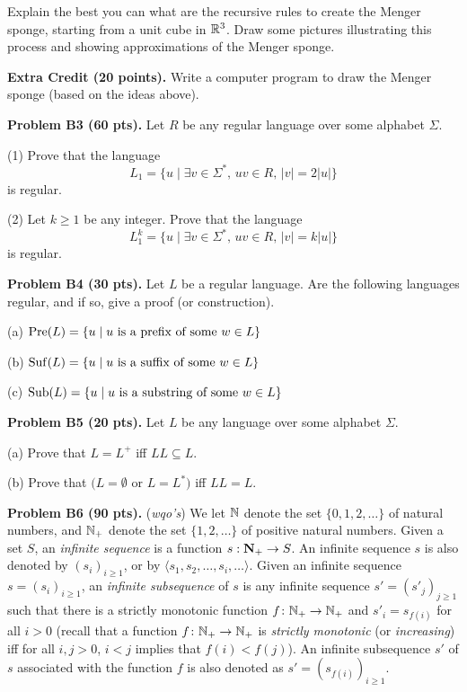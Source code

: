 \documentclass[12pt]{article}
\def\fseq#1#2{(#1_{#2})_{#2\geq 1}}
\def\fsseq#1#2#3{(#1_{#3(#2)})_{#2\geq 1}}
\begin{document}
\medskip
Explain the best you can what are the recursive rules to create
the Menger sponge, starting from a unit cube in $\mathbb{R}^3$.
Draw some pictures illustrating this process and showing
approximations of the Menger sponge.

\medskip\noindent
{\bf Extra Credit (20 points).}
Write a computer program to draw  the Menger sponge (based on the ideas
above).


\vspace {0.25cm}
\noindent
{\bf Problem B3 (60 pts).} 
Let $R$ be any regular language
over some alphabet $\Sigma$. 

\medskip
(1)
Prove that the language
$$L_1 = \{u \mid \exists v\in\Sigma^*,\, uv\in R,\, |v| = 2|u|\}$$
is regular.

\medskip
(2) Let $k\geq 1$ be any integer.
Prove that the language
$$L_1^k = \{u \mid \exists v\in\Sigma^*,\, uv\in R,\, |v| = k|u|\}$$
is regular.



\vspace{0.25cm}
\noindent
{\bf Problem B4 (30 pts).}
Let $L$ be a regular language. Are the following languages regular,
and if so, give a proof (or construction).

\medskip
(a) $\mathrm{Pre}(L) =\{u \mid \hbox{$u$ is a prefix of some $w\in L$}\}$

\medskip
(b) $\mathrm{Suf}(L) =\{u \mid \hbox{$u$ is a suffix of some $w\in L$}\}$

\medskip
(c) $\mathrm{Sub}(L) =\{u \mid \hbox{$u$ is a substring of some $w\in L$}\}$


\vspace{0.25cm}
\noindent
{\bf Problem B5 (20 pts).}
Let $L$ be any language over some alphabet $\Sigma$.

\medskip
(a) Prove that $L = L^+$ iff $LL \subseteq L$.

\medskip
(b) Prove that $(L =\emptyset$ or $L = L^*)$ iff $LL = L$.


\vspace {0.5cm}\noindent
{\bf Problem B6 (90 pts).} ({\it wqo's\/})
We let $\mathbb{N}$ denote the set $\{0,1,2,\ldots\}$ of natural numbers,
and $\mathbb{N}_{+}$ denote the set 
$\{1,2,\ldots\}$ of positive natural numbers. Given a set $S$,
an {\it infinite sequence\/} is a function $s : {\bf N}_{+} \rightarrow S$.
An infinite sequence $s$ is also denoted by $\fseq{s}{i}$, or
by $\langle s_{1},s_{2},\ldots,s_{i},\ldots\rangle$.
Given an infinite sequence $s=\fseq{s}{i}$, an {\it infinite subsequence\/}
of $s$ is any infinite sequence
$s'=\fseq{s'}{j}$ such that there is a strictly monotonic function
$f\colon \mathbb{N}_+\rightarrow \mathbb{N}_+$ 
and
$s'_{i}=s_{f(i)}$ for  all $i>0$
(recall that
a function $f\colon \mathbb{N}_+\rightarrow \mathbb{N}_+$ 
is {\it strictly monotonic\/} (or {\it increasing\/}) 
iff for all $i, j>0$, $i<j$ implies that $f(i)<f(j)$).
An infinite subsequence $s'$ of $s$ associated with
the function $f$ is also denoted as
$s'=\fsseq{s}{i}{f}$.
\end{document}

